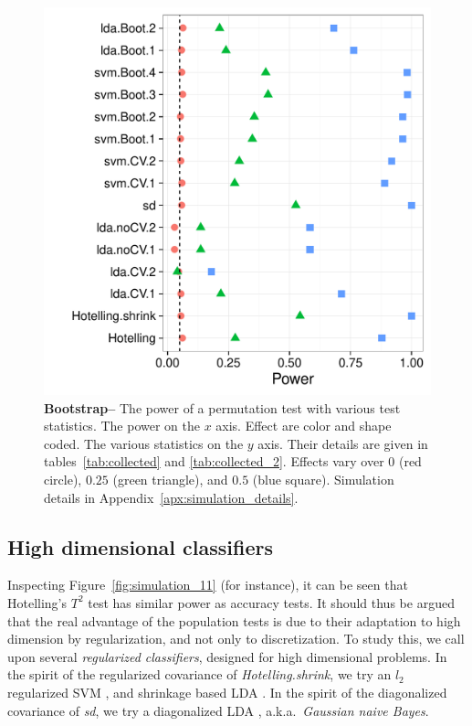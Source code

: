 \documentclass[12pt,a4paper]{article}
\theoremstyle{definition}
\begin{document}
\begin{figure}[ht]
\centering
	  \includegraphics[width=0.7\linewidth]{"art/2016-08-09 20:09:20"}
	  \caption{
		  \textbf{Bootstrap--}
		  The power of a permutation test with various test statistics. 
		  The power on the $x$ axis. 
		  Effect are color and shape coded. 
		  The various statistics on the $y$ axis. 
		  Their details are given in tables~\ref{tab:collected} and \ref{tab:collected_2}. 
		  Effects vary over $0$ (red circle), $0.25$ (green triangle), and $0.5$ (blue square). 
		  Simulation details in Appendix~\ref{apx:simulation_details}.
		  } 
	\label{fig:bootstrap}
\end{figure}


\subsection{High dimensional classifiers}
\label{sec:highdim}
Inspecting Figure~\ref{fig:simulation_11} (for instance), it can be seen that Hotelling's $T^2$ test has similar power as accuracy tests. 
It should thus be argued that the real advantage of the population tests is due to their adaptation to high dimension by regularization, and not only to discretization.
To study this, we call upon several \emph{regularized classifiers}, designed for high dimensional problems. 
In the spirit of the regularized covariance of \emph{Hotelling.shrink}, we try an $l_2$ regularized SVM \cite{friedman_regularization_2010}, and shrinkage based LDA \citep{pang_shrinkage-based_2009,ramey_high-dimensional_2016}. %
In the spirit of the diagonalized covariance of \emph{sd}, we try a diagonalized LDA \citep{dudoit_comparison_2002}, a.k.a.\ \emph{Gaussian naive Bayes}. 
\end{document}
